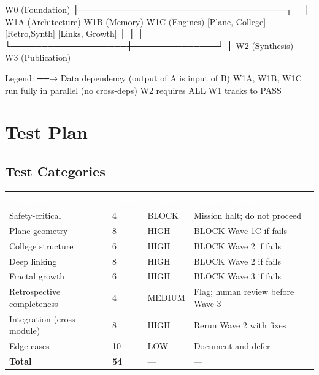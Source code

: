 \documentclass[11pt,letterpaper]{article}
\newcommand{\tableheader}[1]{\textbf{\sffamily\textcolor{white}{#1}}}
\begin{document}
\begin{asciibox}
  W0 (Foundation)
   ├──────────────────────────────────┐
   │                                  │
  W1A (Architecture)    W1B (Memory)  W1C (Engines)
  [Plane, College]       [Retro,Synth]  [Links, Growth]
         │                   │              │
         └───────────────────┼──────────────┘
                             │
                         W2 (Synthesis)
                             │
                         W3 (Publication)

  Legend:
  ──→  Data dependency (output of A is input of B)
  W1A, W1B, W1C run fully in parallel (no cross-deps)
  W2 requires ALL W1 tracks to PASS
\end{asciibox}

\section{Test Plan}

\subsection{Test Categories}

\begin{center}
\begin{tabularx}{\textwidth}{L{3.5cm}C{1.5cm}C{2cm}X}
\toprule
{}
\tableheader{Category} & \tableheader{Count} & \tableheader{Priority} & \tableheader{Failure Action} \\
\midrule
Safety-critical & 4 & BLOCK & Mission halt; do not proceed \\
Plane geometry & 8 & HIGH & BLOCK Wave 1C if fails \\
College structure & 6 & HIGH & BLOCK Wave 2 if fails \\
Deep linking & 8 & HIGH & BLOCK Wave 2 if fails \\
Fractal growth & 6 & HIGH & BLOCK Wave 3 if fails \\
Retrospective completeness & 4 & MEDIUM & Flag; human review before Wave 3 \\
Integration (cross-module) & 8 & HIGH & Rerun Wave 2 with fixes \\
Edge cases & 10 & LOW & Document and defer \\
\midrule
\textbf{Total} & \textbf{54} & --- & --- \\
\bottomrule
\end{tabularx}
\end{center}
\end{document}
